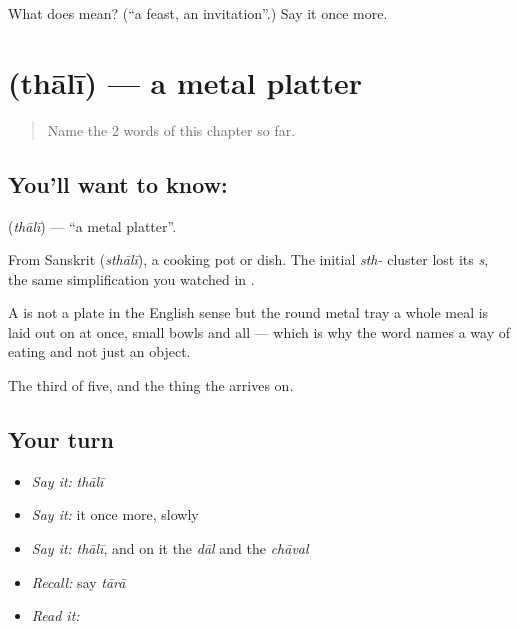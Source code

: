 \begin{tcolorbox}[breakable,colback=teal!4,colframe=teal!35!black,title={Before you move on}]
What does  mean? (\textquotedblleft{}a feast, an invitation\textquotedblright{}.) Say it once more.
\end{tcolorbox}
\section[\texorpdfstring{\hi{थाली} (thālī)}{थाली (thālī)}]{ (thālī) — a metal platter}

\label{lesson:HI-C57-platter}



\begin{quote}
Name the 2 words of this chapter so far.
\end{quote}

\subsection*{You'll want to know: }
\textbf{} (\emph{thālī}) — \textquotedblleft{}a metal platter\textquotedblright{}.

From Sanskrit  (\emph{sthālī}), a cooking pot or dish. The initial \emph{sth-} cluster lost its \emph{s}, the same simplification you watched in .

A  is not a plate in the English sense but the round metal tray a whole meal is laid out on at once, small bowls and all — which is why the word names a way of eating and not just an object.

\begin{grammarlens}[title={What you've built}]
The third of five, and the thing the  arrives on.
\end{grammarlens}

\subsection*{Your turn}
\begin{itemize}
\raggedright
  \item \emph{Say it:} \emph{thālī}
  \item \emph{Say it:} it once more, slowly
  \item \emph{Say it:} \emph{thālī}, and on it the \emph{dāl} and the \emph{chāval}
  \item \emph{Recall:} say \emph{tārā}
  \item \emph{Read it:} \textbf{}
\end{itemize}

